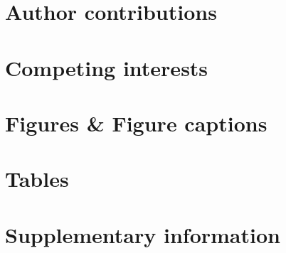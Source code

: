 \documentclass{article}
\begin{document}
\section{Author contributions}

\section{Competing interests}

\section{Figures \& Figure captions}

\section{Tables}
 
\section{Supplementary information}
\end{document}
